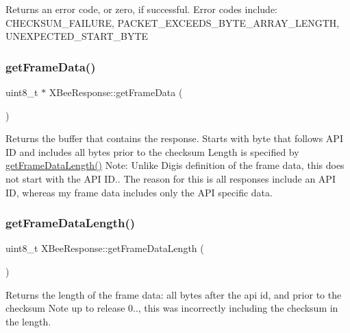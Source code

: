 Returns an error code, or zero, if successful. Error codes include\+: C\+H\+E\+C\+K\+S\+U\+M\+\_\+\+F\+A\+I\+L\+U\+RE, P\+A\+C\+K\+E\+T\+\_\+\+E\+X\+C\+E\+E\+D\+S\+\_\+\+B\+Y\+T\+E\+\_\+\+A\+R\+R\+A\+Y\+\_\+\+L\+E\+N\+G\+TH, U\+N\+E\+X\+P\+E\+C\+T\+E\+D\+\_\+\+S\+T\+A\+R\+T\+\_\+\+B\+Y\+TE \hypertarget{class_x_bee_response_ad958f0b5200138545bdd762111299a94}{}\label{class_x_bee_response_ad958f0b5200138545bdd762111299a94} 
\subsubsection{\texorpdfstring{get\+Frame\+Data()}{getFrameData()}}
{\footnotesize\ttfamily uint8\+\_\+t $\ast$ X\+Bee\+Response\+::get\+Frame\+Data (\begin{DoxyParamCaption}{ }\end{DoxyParamCaption})}

Returns the buffer that contains the response. Starts with byte that follows A\+PI ID and includes all bytes prior to the checksum Length is specified by \hyperlink{class_x_bee_response_a6205be340c4f0397a68dadbdca36a091}{get\+Frame\+Data\+Length()} Note\+: Unlike Digi\textquotesingle{}s definition of the frame data, this does not start with the A\+PI ID.. The reason for this is all responses include an A\+PI ID, whereas my frame data includes only the A\+PI specific data. \hypertarget{class_x_bee_response_a6205be340c4f0397a68dadbdca36a091}{}\label{class_x_bee_response_a6205be340c4f0397a68dadbdca36a091} 
\subsubsection{\texorpdfstring{get\+Frame\+Data\+Length()}{getFrameDataLength()}}
{\footnotesize\ttfamily uint8\+\_\+t X\+Bee\+Response\+::get\+Frame\+Data\+Length (\begin{DoxyParamCaption}{ }\end{DoxyParamCaption})}

Returns the length of the frame data\+: all bytes after the api id, and prior to the checksum Note up to release 0.., this was incorrectly including the checksum in the length. \hypertarget{class_x_bee_response_acb1b40edafa22461776b75bd5d7caadf}{}\label{class_x_bee_response_acb1b40edafa22461776b75bd5d7caadf} 
